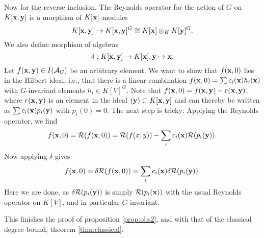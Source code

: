 \documentclass[../main.tex]{subfiles}
\begin{document}
Now for the reverse inclusion. The Reynolds operator for the action of $G$ on 
$K[\mathbf{x} ,\mathbf{y}]$ is a morphism of $K[\mathbf{x}]$-modules
\begin{equation*}
    K[\mathbf{x},\mathbf{y}] \to K[\mathbf{x}, \mathbf{y}]^G \cong K[\mathbf{x}] \otimes_K K[\mathbf{y}]^G.
\end{equation*}
We also define morphism of algebras
\begin{equation*}
    \delta: K[\mathbf{x},\mathbf{y}] \to K[\mathbf{x}], \mathbf{y} \mapsto \mathbf{x}.
\end{equation*}
Let $f(\mathbf{x},\mathbf{y}) \in I(\mathcal{A}_G)$ be an arbitrary element. We want to show that 
$f(\mathbf{x},0)$ lies in the Hilbert ideal, i.e., that there is a linear combination
$f(\mathbf{x}, 0) = \sum c_i(\mathbf{x}) h_i(\mathbf{x})$ with $G$-invariant elements $h_i \in K[V]^G$. 
Note that $f(\mathbf{x},0) = f(\mathbf{x},\mathbf{y}) - r(\mathbf{x},\mathbf{y})$, where $r(\mathbf{x},\mathbf{y})$ is an element
in the ideal $(\mathbf{y}) \subset K[\mathbf{x},\mathbf{y}]$ and can thereby be written as $\sum
c_i(\mathbf{x})p_i(\mathbf{y})$ with $p_i(0) = 0$. The next step is tricky: Applying the
Reynolds operator, we find 
\begin{equation*}
    f(\mathbf{x}, 0) = \mathcal{R}(f(\mathbf{x},0)) = \mathcal{R}(f(x,y)) - \sum_i c_i(\mathbf{x}) \mathcal{R}(p_i(\mathbf{y})).
\end{equation*}
Now applying $\delta$ gives
\begin{equation*}
    f(\mathbf{x},0) = \delta \mathcal{R}(f(\mathbf{x},0)) = \sum_i c_i(\mathbf{x}) \delta \mathcal{R}(p_i(\mathbf{y})).
\end{equation*}
Here we are done, as $\delta \mathcal{R}(p_i(\mathbf{y}))$ is simply $\mathcal{R}(p_i(\mathbf{x}))$ with the 
usual Reynolds operator on $K[V]$, and in particular $G$-invariant. 

This finishes the proof of proposition \ref{prop:obs2}, and with that of the
classical degree bound, theorem \ref{thm:classical}.
\end{document}
